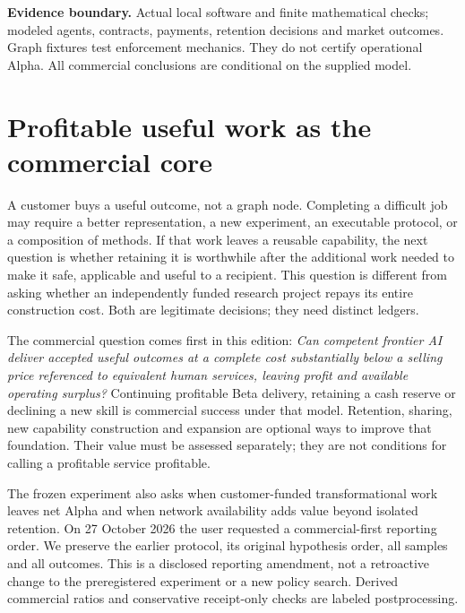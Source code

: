 \documentclass[11pt,letterpaper]{article}
\begin{document}
\begin{titlepage}
\begin{abstract}
the favorable network-minus-Beta mean is USD$-8,766$ with an interval spanning
loss and gain. A tested Alpha-gated graph, a mixed exact mathematical witness,
6,048 simulated histories and complete ledgers make these distinctions
reproducible. No actual customer sale, substantive frontier task trial, live ENS
enforcement or production certification is demonstrated. Quality, scope,
demand and workload assumptions bound the commercial inference; capability
compounding and recursive improvement require separate evidence.
\end{abstract}
\vfill
\colorbox{light}{\parbox{0.95\linewidth}{\small
\textbf{Evidence boundary.} Actual local software and finite mathematical checks;
modeled agents, contracts, payments, retention decisions and market outcomes.
Graph fixtures test enforcement mechanics. They do not certify operational Alpha.
All commercial conclusions are conditional on the supplied model.}}
\end{titlepage}
\hypersetup{pageanchor=true}

\section{Profitable useful work as the commercial core}

A customer buys a useful outcome, not a graph node. Completing a difficult job may
require a better representation, a new experiment, an executable protocol, or a
composition of methods. If that work leaves a reusable capability, the next
question is whether retaining it is worthwhile after the additional work needed
to make it safe, applicable and useful to a recipient. This question is different
from asking whether an independently funded research project repays its entire
construction cost. Both are legitimate decisions; they need distinct ledgers.

The commercial question comes first in this edition: \emph{Can competent frontier
AI deliver accepted useful outcomes at a complete cost substantially below a
selling price referenced to equivalent human services, leaving profit and
available operating surplus?} Continuing profitable Beta delivery, retaining a
cash reserve or declining a new skill is commercial success under that model.
Retention, sharing, new capability construction and expansion are optional ways
to improve that foundation. Their value must be assessed separately; they are
not conditions for calling a profitable service profitable.

The frozen experiment also asks when customer-funded transformational work leaves
net Alpha and when network availability adds value beyond isolated retention.
On 27 October 2026 the user requested a commercial-first reporting order. We
preserve the earlier protocol, its original hypothesis order, all samples and
all outcomes. This is a disclosed reporting amendment, not a retroactive change
to the preregistered experiment or a new policy search. Derived commercial
ratios and conservative receipt-only checks are labeled postprocessing.
\end{document}
